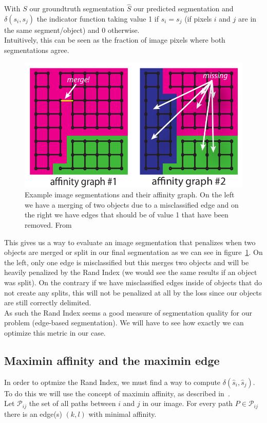 With $S$ our groundtruth segmentation $\hat{S}$ our predicted segmentation and
$\delta(s_i,s_j)$ the indicator function taking value 1 if $s_i = s_j$ (if
pixels $i$ and $j$ are in the same segment/object) and 0 otherwise.\\
Intuitively, this can be seen as the fraction of image pixels where both
segmentations agree.

\begin{figure}[!htbp]
	\centering
	\includegraphics[width=0.45\linewidth]{./images/affinity_graphs.png}
	\caption{Example image segmentations and their affinity graph. On the left
	we have a merging of two objects due to a misclassified edge and on the
right we have edges that should be of value 1 that have been removed. From~\cite{turaga_maximin_2009}}%
	\label{fig:affinity_graphs}
\end{figure}

This gives us a way to evaluate an image segmentation that penalizes when two
objects are merged or split in our final segmentation as we can see in
figure~\ref{fig:affinity_graphs}. On the left, only one edge is misclassified
but this merges two objects and will be heavily penalized by the Rand Index (we
would see the same results if an object was split). On the contrary if we have
misclassified edges inside of objects that do not create any splits, this will
not be penalized at all by the loss since our objects are still correctly
delimited.\\

As such the Rand Index seems a good measure of segmentation quality for our
problem (edge-based segmentation). We will have to see how exactly we can
optimize this metric in our case.

\subsection{Maximin affinity and the maximin edge}

In order to optmize the Rand Index, we must find a way to compute
$\delta(\hat{s}_i,\hat{s}_j)$. To do this we will use the concept of maximin
affinity, as described in~\cite{turaga_maximin_2009}.\\
Let $\mathcal{P}_{ij}$ the set of all paths between $i$ and $j$ in our image.
For every path $P\in\mathcal{P}_{ij}$ there is an edge(s) $(k,l)$ with minimal
affinity.\\

